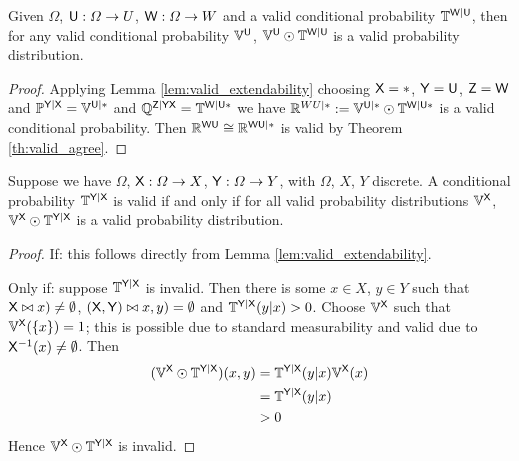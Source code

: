 \begin{corollary}
Given $\Omega$, $\RV{U}:\Omega\to U$, $\RV{W}:\Omega\to W$ and a valid conditional probability $\prob{T}^{\RV{W}|\RV{U}}$, then for any valid conditional probability $\prob{V}^{\RV{U}}$, $\prob{V}^{\RV{U}}\odot \prob{T}^{\RV{W}|\RV{U}}$ is a valid probability distribution.
\end{corollary}

\begin{proof}
Applying Lemma \ref{lem:valid_extendability} choosing $\RV{X}=*$, $\RV{Y}=\RV{U}$, $\RV{Z}=\RV{W}$ and $\prob{P}^{\RV{Y}|\RV{X}}=\prob{V}^{\RV{U}|*}$ and $\prob{Q}^{\RV{Z}|\RV{YX}}=\prob{T}^{\RV{W}|\RV{U*}}$ we have $\prob{R}^{WU|*}:=\prob{V}^{\RV{U}|*}\odot \prob{T}^{\RV{W}|\RV{U}*}$ is a valid conditional probability. Then $\prob{R}^{\RV{WU}}\cong \prob{R}^{\RV{WU}|*}$ is valid by Theorem \ref{th:valid_agree}.
\end{proof}

\begin{theorem}\label{th:valid_conditional_probability}
Suppose we have $\Omega$, $\RV{X}:\Omega\to X$, $\RV{Y}:\Omega\to Y$, with $\Omega$, $X$, $Y$ discrete. A conditional probability $\prob{T}^{\RV{Y}|\RV{X}}$ is valid if and only if for all valid probability distributions $\prob{V}^{\RV{X}}$, $\prob{V}^{\RV{X}}\odot \prob{T}^{\RV{Y}|\RV{X}}$ is a valid probability distribution.
\end{theorem}

\begin{proof}
If: this follows directly from Lemma \ref{lem:valid_extendability}.

Only if: suppose $\prob{T}^{\RV{Y}|\RV{X}}$ is invalid. Then there is some $x\in X$, $y\in Y$ such that $\RV{X}\yields(x)\neq \emptyset$, $(\RV{X},\RV{Y})\yields(x,y)=\emptyset$ and $\prob{T}^{\RV{Y}|\RV{X}}(y|x)>0$. Choose $\prob{V}^{\RV{X}}$ such that $\prob{V}^{\RV{X}}(\{x\})=1$; this is possible due to standard measurability and valid due to $\RV{X}^{-1}(x)\neq \emptyset$. Then
\begin{align}
	(\prob{V}^{\RV{X}}\odot \prob{T}^{\RV{Y}|\RV{X}})(x,y) &= \prob{T}^{\RV{Y}|\RV{X}}(y|x) \prob{V}^{\RV{X}}(x)\\
																	 &= \prob{T}^{\RV{Y}|\RV{X}}(y|x)\\
																	 &>0
\end{align}
Hence $\prob{V}^{\RV{X}}\odot \prob{T}^{\RV{Y}|\RV{X}}$ is invalid.
\end{proof}

